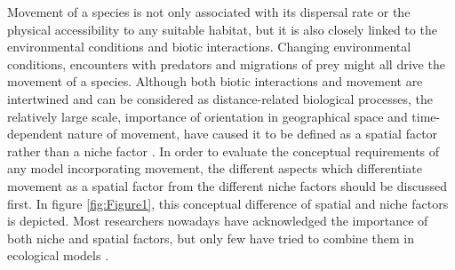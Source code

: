 \documentclass[12pt,authoryear]{elsarticle}
\begin{document}
Movement of a species is not only associated with its dispersal rate or the physical accessibility to any suitable habitat, but it is also closely linked to the environmental conditions and biotic interactions. Changing environmental conditions, encounters with predators and migrations of prey might all drive the movement of a species. Although both biotic interactions and movement are intertwined and can be considered as distance-related biological processes, the relatively large scale, importance of orientation in geographical space and time-dependent nature of movement, have caused it to be defined as a spatial factor rather than a niche factor \citep{Araujo2006,Guisan2006}. In order to evaluate the conceptual requirements of any model incorporating movement, the different aspects which differentiate movement as a spatial factor from the different niche factors should be discussed first. In figure \ref{fig:Figure1}, this conceptual difference of spatial and niche factors is depicted. Most researchers nowadays have acknowledged the importance of both niche and spatial factors, but only few have tried to combine them in ecological models \citep{Franklin2010,Peterson2011}. 
\end{document}
